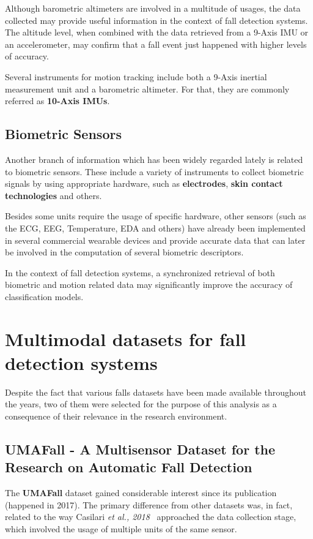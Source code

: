 Although barometric altimeters are involved in a multitude of usages, the data collected may provide useful information in the context of fall detection systems. The altitude level, when combined with the data retrieved from a 9-Axis IMU or an accelerometer, may confirm that a fall event just happened with higher levels of accuracy.

Several instruments for motion tracking include both a 9-Axis inertial measurement unit and a barometric altimeter. For that, they are commonly referred as \textbf{10-Axis IMUs}.

\subsection{Biometric Sensors}\label{subsec:biometric-sensors}

Another branch of information which has been widely regarded lately is related to biometric sensors. These include a variety of instruments to collect biometric signals by using appropriate hardware, such as \textbf{electrodes}, \textbf{skin contact technologies} and others.

Besides some units require the usage of specific hardware, other sensors (such as the ECG, EEG, Temperature, EDA and others) have already been implemented in several commercial wearable devices and provide accurate data that can later be involved in the computation of several biometric descriptors. 

In the context of fall detection systems, a synchronized retrieval of both biometric and motion related data may significantly improve the accuracy of classification models.

\section{Multimodal datasets for fall detection systems}\label{sec:datasets}

Despite the fact that various falls datasets have been made available throughout the years, two of them were selected for the purpose of this analysis as a consequence of their relevance in the research environment.

\subsection{UMAFall - A Multisensor Dataset for the Research on Automatic Fall Detection}\label{subsec:umafall}

The \textbf{UMAFall} dataset gained considerable interest since its publication (happened in 2017). The primary difference from other datasets was, in fact, related to the way Casilari \textit{et al., 2018}~\cite{umafall} approached the data collection stage, which involved the usage of multiple units of the same sensor. 

